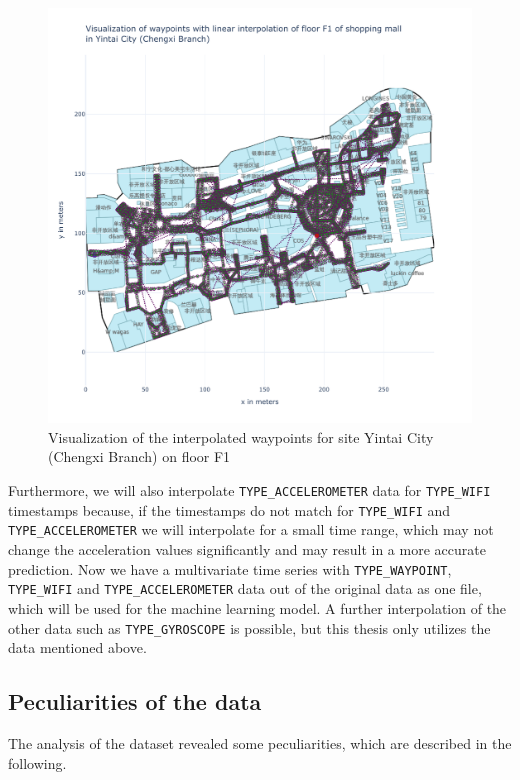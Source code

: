 \begin{figure}[h!]
    \centering
    \includegraphics[scale=0.375]{images/whole_floor_visualization_interpolated.pdf}
    \caption{Visualization of the interpolated waypoints for site Yintai City (Chengxi Branch) on floor F1}
    \label{fig:vis-interpolated}
\end{figure}

Furthermore, we will also interpolate \texttt{TYPE\_ACCELEROMETER} data for \texttt{TYPE\_WIFI} timestamps because, if the timestamps do not match for \texttt{TYPE\_WIFI} and \texttt{TYPE\_ACCELEROMETER} we will interpolate for a small time range, which may not change the acceleration values significantly and may result in a more accurate prediction.
Now we have a multivariate time series with \texttt{TYPE\_WAYPOINT}, \texttt{TYPE\_WIFI} and \texttt{TYPE\_ACCELEROMETER} data out of the original data as one file, which will be used for the machine learning model.
A further interpolation of the other data such as \texttt{TYPE\_GYROSCOPE} is possible, but this thesis only utilizes the data mentioned above.


\subsection{Peculiarities of the data}\label{sec:special-cases}
The analysis of the dataset revealed some peculiarities, which are described in the following.

